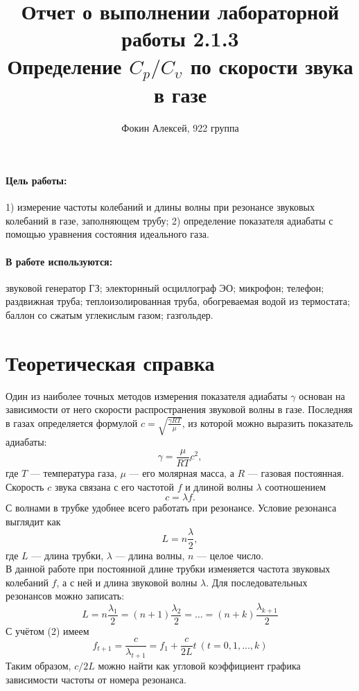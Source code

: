 \documentclass[12pt,a4paper]{article}
\title{
Отчет о выполнении лабораторной работы 2.1.3 \\
Определение $C_p/C_\upsilon$ по скорости звука в газе
}
\author{Фокин Алексей, 922 группа}
\begin{document}
\maketitle

\paragraph{Цель работы:} 1) измерение частоты колебаний и длины волны при резонансе звуковых колебаний в газе, заполняющем трубу; 2) определение показателя адиабаты с помощью уравнения состояния идеального газа.
\paragraph{В работе используются:} звуковой генератор ГЗ; электорнный осциллограф ЭО; микрофон; телефон; раздвижная труба; теплоизолированная труба, обогреваемая водой из термостата; баллон со сжатым углекислым газом; газгольдер.

\section{Теоретическая справка}
 Один из наиболее точных методов измерения показателя адиабаты $\gamma$ основан на зависимости от него скорости распространения звуковой волны в газе. Последняя в газах определяется формулой $c = \sqrt{\frac{\gamma RT}{\mu}}$, из которой можно выразить показатель адиабаты:
 	\begin{equation}
 	\gamma = \frac{\mu}{RT}c^2,
 	\end{equation}
где $T$ --- температура газа, $\mu$ --- его молярная масса, а $R$ --- газовая постоянная. \\
Скорость $c$ звука связана с его частотой $f$ и длиной волны $\lambda$ соотношением
	\begin{equation}
	c = \lambda f.
	\end{equation}
С волнами в трубке удобнее всего работать при резонансе. Условие резонанса выглядит как
	\begin{equation}
	L = n\frac{\lambda}{2},
	\end{equation}
где $L$ --- длина трубки, $\lambda$ --- длина волны, $n$ --- целое число.\\
В данной работе при постоянной длине трубки изменяется частота звуковых колебаний $f$, а с ней и длина звуковой волны $\lambda$. Для последовательных резонансов можно записать:
	\begin{equation}
	L = n\frac{\lambda_1}{2} = (n + 1)\frac{\lambda_2}{2} = ... = (n + k)\frac{\lambda_{k + 1}}{2}
	\end{equation}
С учётом (2) имеем
	\begin{equation}
	f_{t+1} = \frac{c}{\lambda_{t+1}} = f_1 + \frac{c}{2L}t~ (t = 0, 1,..., k)
	\end{equation}
Таким образом, $c/2L$ можно найти как угловой коэффициент графика зависимости частоты от номера резонанса.
\end{document}
